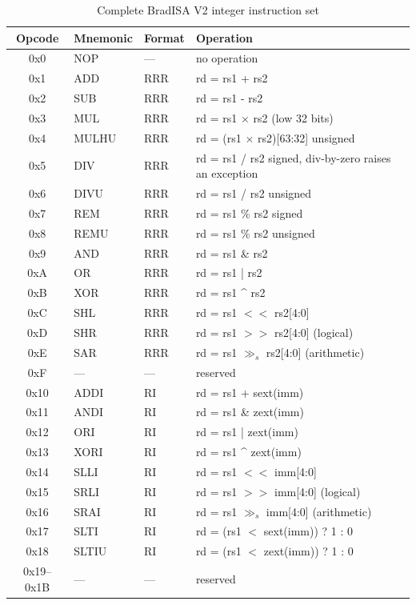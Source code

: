 \documentclass[11pt,a4paper]{article}
\begin{document}
\begin{table}[htbp]
\centering
\caption{Complete BradISA V2 integer instruction set}
\begin{tabular}{cllp{7.4cm}}
\toprule
Opcode & Mnemonic & Format & Operation \\
\midrule
0x0 & NOP    & --- & no operation \\
0x1 & ADD    & RRR & rd = rs1 + rs2 \\
0x2 & SUB    & RRR & rd = rs1 - rs2 \\
0x3 & MUL    & RRR & rd = rs1 $\times$ rs2 (low 32 bits) \\
0x4 & MULHU  & RRR & rd = (rs1 $\times$ rs2)[63:32] unsigned \\
0x5 & DIV    & RRR & rd = rs1 / rs2 signed, div-by-zero raises an exception \\
0x6 & DIVU   & RRR & rd = rs1 / rs2 unsigned \\
0x7 & REM    & RRR & rd = rs1 \% rs2 signed \\
0x8 & REMU   & RRR & rd = rs1 \% rs2 unsigned \\
0x9 & AND    & RRR & rd = rs1 \& rs2 \\
0xA & OR     & RRR & rd = rs1 | rs2 \\
0xB & XOR    & RRR & rd = rs1 \^{} rs2 \\
0xC & SHL    & RRR & rd = rs1 $<<$ rs2[4:0] \\
0xD & SHR    & RRR & rd = rs1 $>>$ rs2[4:0] (logical) \\
0xE & SAR    & RRR & rd = rs1 $\gg_s$ rs2[4:0] (arithmetic) \\
0xF & ---    & --- & reserved \\
\midrule
0x10 & ADDI   & RI  & rd = rs1 + sext(imm) \\
0x11 & ANDI   & RI  & rd = rs1 \& zext(imm) \\
0x12 & ORI    & RI  & rd = rs1 | zext(imm) \\
0x13 & XORI   & RI  & rd = rs1 \^{} zext(imm) \\
0x14 & SLLI   & RI  & rd = rs1 $<<$ imm[4:0] \\
0x15 & SRLI   & RI  & rd = rs1 $>>$ imm[4:0] (logical) \\
0x16 & SRAI   & RI  & rd = rs1 $\gg_s$ imm[4:0] (arithmetic) \\
0x17 & SLTI   & RI  & rd = (rs1 $<$ sext(imm)) ? 1 : 0 \\
0x18 & SLTIU  & RI  & rd = (rs1 $<$ zext(imm)) ? 1 : 0 \\
0x19--0x1B & --- & --- & reserved \\

\end{tabular}
\end{table}
\end{document}
